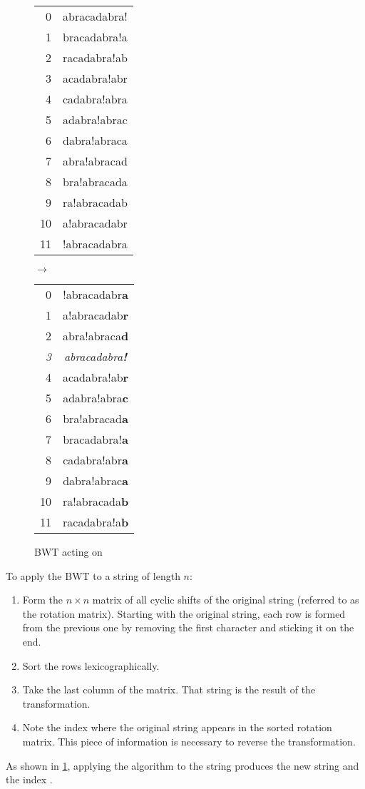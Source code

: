 \documentclass[sigplan,10pt,anonymous,review]{thesis}
\begin{document}
\begin{figure}
  \centering
  \begin{tt}
  \begin{tabular}{rc}
    0  & abracadabra! \\
    1  & bracadabra!a \\
    2  & racadabra!ab \\
    3  & acadabra!abr \\
    4  & cadabra!abra \\
    5  & adabra!abrac \\
    6  & dabra!abraca \\
    7  & abra!abracad \\
    8  & bra!abracada \\
    9  & ra!abracadab \\
    10 & a!abracadabr \\
    11 & !abracadabra
  \end{tabular}
  $\rightarrow$
  \begin{tabular}{rc}
    0  & !abracadabr\textbf{a} \\
    1  & a!abracadab\textbf{r} \\
    2  & abra!abraca\textbf{d} \\
    \textit{3} & \textit{abracadabra\textbf{!}} \\
    4  & acadabra!ab\textbf{r} \\
    5  & adabra!abra\textbf{c} \\
    6  & bra!abracad\textbf{a} \\
    7  & bracadabra!\textbf{a} \\
    8  & cadabra!abr\textbf{a} \\
    9  & dabra!abrac\textbf{a} \\
    10 & ra!abracada\textbf{b} \\
    11 & racadabra!a\textbf{b}
  \end{tabular}
  \end{tt}
  \caption{BWT acting on }
  \label{fig:bw_ex}
\end{figure}

To apply the BWT to a string of length $n$:
\begin{enumerate}
\item Form the \(n \times n\) matrix of all cyclic shifts of the
  original string (referred to as the rotation matrix). Starting
  with the original string, each row is formed from the previous one
  by removing the first character and sticking it on the end.
\item Sort the rows lexicographically.
\item Take the last column of the matrix. That string is the result of
  the transformation.
\item Note the index where the original string appears in the sorted
  rotation matrix. This piece of information is necessary to reverse
  the transformation.
\end{enumerate}
As shown in \cref{fig:bw_ex}, applying the algorithm to the string
 produces the new string  and the
index .
\end{document}

